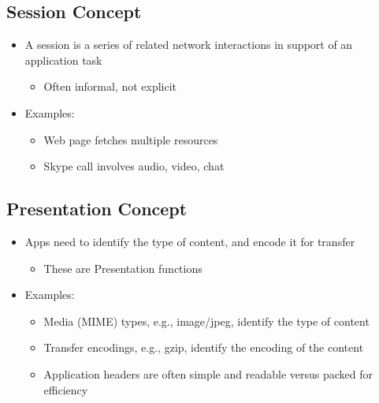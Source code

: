 \documentclass[12pt]{ctexart}   %
\begin{document}
	\subsection{Session Concept}
	\begin{itemize}
		\item A session is a series of related network interactions in support of an application task
		\begin{itemize}
			\item Often informal, not explicit
		\end{itemize}
		
		\item Examples:
		\begin{itemize}
			\item Web page fetches multiple resources
			\item Skype call involves audio, video, chat
		\end{itemize}
	\end{itemize}
	
	\subsection{Presentation Concept}
	\begin{itemize}
		\item Apps need to identify the type of content, and encode it for transfer
		\begin{itemize}
			\item These are Presentation functions
		\end{itemize}
		
		\item Examples:
		\begin{itemize}
			\item Media (MIME) types, e.g., image/jpeg, identify the type of content
			\item Transfer encodings, e.g., gzip, identify the encoding of the content
			\item Application headers are often simple and readable versus packed for efficiency
		\end{itemize}
	\end{itemize}
	
\end{document}
